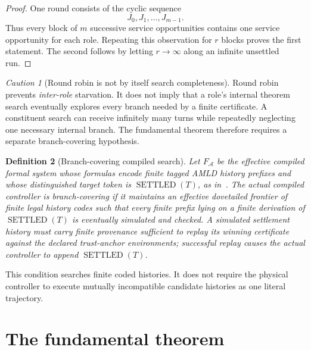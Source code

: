 \documentclass[11pt]{article}
\newtheorem{definition}{Definition}[section]
\theoremstyle{remark}
\newtheorem{caution}[definition]{Caution}
\newcommand{\Sett}{\operatorname{SETTLED}}
\begin{document}
\begin{proof}
One round consists of the cyclic sequence
\[
J_0,J_1,\ldots,J_{m-1}.
\]
Thus every block of $m$ successive service opportunities contains one service opportunity for each role.  Repeating this observation for $r$ blocks proves the first statement.  The second follows by letting $r\to\infty$ along an infinite unsettled run.
\end{proof}

\begin{caution}[Round robin is not by itself search completeness]
Round robin prevents \emph{inter-role} starvation.  It does not imply that a role's internal theorem search eventually explores every branch needed by a finite certificate.  A constituent search can receive infinitely many turns while repeatedly neglecting one necessary internal branch.  The fundamental theorem therefore requires a separate branch-covering hypothesis.
\end{caution}

\begin{definition}[Branch-covering compiled search]
Let $F_{\mathcal A}$ be the effective compiled formal system whose formulas encode finite tagged AMLD history prefixes and whose distinguished target token is $\Sett(T)$, as in~\cite{SettlementATP}.  The actual compiled controller is \emph{branch-covering} if it maintains an effective dovetailed frontier of finite legal history codes such that every finite prefix lying on a finite derivation of $\Sett(T)$ is eventually simulated and checked.  A simulated settlement history must carry finite provenance sufficient to replay its winning certificate against the declared trust-anchor environments; successful replay causes the actual controller to append $\Sett(T)$.
\end{definition}

This condition searches finite coded histories.  It does not require the physical controller to execute mutually incompatible candidate histories as one literal trajectory.

\section{The fundamental theorem}
\end{document}

